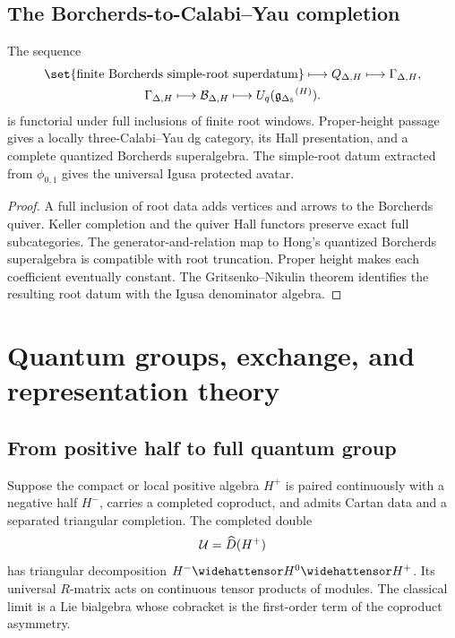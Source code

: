 \chapter{The Borcherds-to-Calabi--Yau completion}
\begin{theorem}
The sequence
\[
\begin{gathered}
 \set{\text{finite Borcherds simple-root superdatum}}
 \longmapsto Q_{\Delta,H}
 \longmapsto \Gamma_{\Delta,H},\\
 \Gamma_{\Delta,H}
 \longmapsto \mathcal B_{\Delta,H}
 \longmapsto U_q(\gDelta^{(H)}).
\end{gathered}
\]
is functorial under full inclusions of finite root windows.  Proper-height passage gives a locally three-Calabi--Yau dg category, its Hall presentation, and a complete quantized Borcherds superalgebra.  The simple-root datum extracted from $\phi_{0,1}$ gives the universal Igusa protected avatar.
\end{theorem}
\begin{proof}
A full inclusion of root data adds vertices and arrows to the Borcherds quiver.  Keller completion and the quiver Hall functors preserve exact full subcategories.  The generator-and-relation map to Hong's quantized Borcherds superalgebra is compatible with root truncation.  Proper height makes each coefficient eventually constant.  The Gritsenko--Nikulin theorem identifies the resulting root datum with the Igusa denominator algebra.
\end{proof}


\part{Quantum groups, exchange, and representation theory}

\chapter{From positive half to full quantum group}
Suppose the compact or local positive algebra $H^+$ is paired continuously with a negative half $H^-$, carries a completed coproduct, and admits Cartan data and a separated triangular completion. The completed double
\[
 \mathcal U=\widehat D(H^+)
\]
has triangular decomposition $H^-\widehattensor H^0\widehattensor H^+$. Its universal $R$-matrix acts on continuous tensor products of modules. The classical limit is a Lie bialgebra whose cobracket is the first-order term of the coproduct asymmetry.

